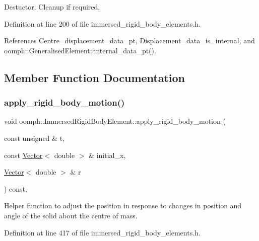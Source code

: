 Destuctor\+: Cleanup if required. 



Definition at line 200 of file immersed\+\_\+rigid\+\_\+body\+\_\+elements.\+h.



References Centre\+\_\+displacement\+\_\+data\+\_\+pt, Displacement\+\_\+data\+\_\+is\+\_\+internal, and oomph\+::\+Generalised\+Element\+::internal\+\_\+data\+\_\+pt().



\subsection{Member Function Documentation}
\mbox{\label{classoomph_1_1ImmersedRigidBodyElement_af115b2b370039678ebe619be333efc9f}} 
\subsubsection{\texorpdfstring{apply\+\_\+rigid\+\_\+body\+\_\+motion()}{apply\_rigid\_body\_motion()}}
{\footnotesize\ttfamily void oomph\+::\+Immersed\+Rigid\+Body\+Element\+::apply\+\_\+rigid\+\_\+body\+\_\+motion (\begin{DoxyParamCaption}\item[{const unsigned \&}]{t,  }\item[{const \hyperlink{classoomph_1_1Vector}{Vector}$<$ double $>$ \&}]{initial\+\_\+x,  }\item[{\hyperlink{classoomph_1_1Vector}{Vector}$<$ double $>$ \&}]{r }\end{DoxyParamCaption}) const\hspace{0.3cm}{\ttfamily [inline]}, {\ttfamily [protected]}}



Helper function to adjust the position in response to changes in position and angle of the solid about the centre of mass. 



Definition at line 417 of file immersed\+\_\+rigid\+\_\+body\+\_\+elements.\+h.



